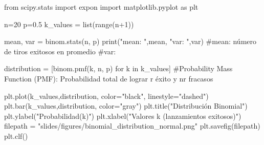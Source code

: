 from scipy.stats import expon
import matplotlib.pyplot as plt

n=20
p=0.5
k_values = list(range(n+1))

mean, var = binom.stats(n, p)
print("mean: ",mean, "var: ",var)
#mean: número de tiros exitosos en promedio
#var: 

distribution = [binom.pmf(k, n, p) for k in k_values]
#Probability Mass Function (PMF): Probabilidad total de lograr r éxito y nr fracasos


plt.plot(k_values,distribution, color="black", linestyle="dashed")
plt.bar(k_values,distribution, color="gray")
plt.title("Distribución Binomial")
plt.ylabel("Probabilidad(k)")
plt.xlabel("Valores k (lanzamientos exitosos)")
filepath = "slides/figures/binomial_distribution_normal.png"
plt.savefig(filepath)
plt.clf()
